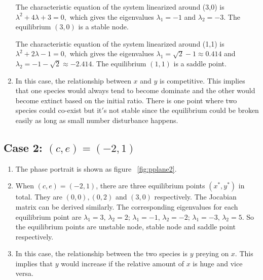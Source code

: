 \begin{enumerate}
The characteristic equation of the system linearized around \mbox{(3,0)} is
$\lambda^2 +4 \lambda + 3 = 0,$ which gives the eigenvalues $\lambda_1 = -1$ and $\lambda_2 = -3$. The equilibrium $(3,0)$ is a stable node.

The characteristic equation of the system linearized around \mbox{(1,1)} is $\lambda^2 +2 \lambda - 1 = 0,$ which gives the eigenvalues $\lambda_1 = \sqrt{2} -1 \approx 0.414$ and $\lambda_2 = -1 -\sqrt{2} \approx -2.414$. The equilibrium $(1,1)$ is a saddle point.

\item In this case, the relationship between $x$ and $y$ is competitive. This implies that one species would always tend to become dominate and the other would become extinct based on the initial ratio. There is one point where two species could co-exist but it$'$s not stable since the equilibrium could be broken easily as long as small number disturbance happens.  
\end{enumerate}

\subsection*{Case 2: $(c,e)=(-2,1)$}
\begin{enumerate}
\item The phase portrait is shown as figure ~\ref{fig:pplane2}.
\item When $(c,e)=(-2,1)$, there are three equilibrium points $(x^*,y^*)$ in total. They are $(0,0),(0,2)$ and $(3,0)$ respectively. The Jocabian matrix can be derived similarly. The corresponding eigenvalues for each equilibrium point are $\lambda_{1} = 3$, $\lambda_{2} = 2$; $\lambda_1 = -1$, $\lambda_2 = -2$; $\lambda_1 = -3$, $\lambda_2 = 5$. So the equilibrium points are unstable node, stable node and saddle point respectively.
\item In this case, the relationship between the two species is $y$ preying on $x$. This implies that $y$ would increase if the relative amount of $x$ is huge and vice versa.
\end{enumerate}

